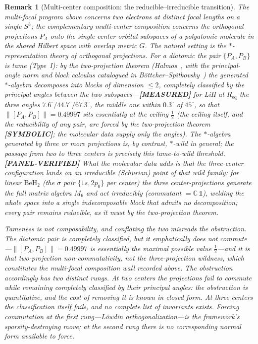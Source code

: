 \documentclass[11pt]{article}
\providecommand{\sthree}{S^3}
\newtheorem{remark}{Remark}
\begin{document}
\begin{remark}[Multi-center composition: the reducible--irreducible transition]
\label{rem:multicenter_composition}
The multi-focal program above concerns two electrons at distinct focal
lengths on a single $\sthree$; the complementary \emph{multi-center}
composition concerns the orthogonal projections $P_A$ onto the
single-center orbital subspaces of a polyatomic molecule in the shared
Hilbert space with overlap metric $G$.  The natural setting is the
\emph{$*$-representation} theory of orthogonal projections.  For a
\emph{diatomic} the pair $\{P_A, P_B\}$ is \emph{tame} (Type~I): by the
two-projection theorem (Halmos~\cite{halmos1969}, with the principal-angle
norm and block calculus catalogued in B\"ottcher--Spitkovsky~\cite{bottcher_spitkovsky2010})
the generated $*$-algebra decomposes
into blocks of dimension $\le 2$, completely classified by the principal
angles between the two subspaces---\textbf{[MEASURED]} for LiH at $R_{\mathrm{eq}}$ the three
angles $7.6^\circ / 44.7^\circ / 67.3^\circ$, the middle one within
$0.3^\circ$ of $45^\circ$, so that $\lVert [P_A, P_B] \rVert = 0.49997$
sits essentially at the ceiling $\tfrac12$ (the ceiling itself, and the
reducibility of any pair, are forced by the two-projection theorem
\textbf{[SYMBOLIC]}; the molecular data supply only the angles).  The
$*$-algebra generated by
\emph{three or more} projections is, by contrast, $*$-wild in general;
the passage from two to three centers is precisely this tame-to-wild
threshold.  \textbf{[PANEL-VERIFIED]} What the molecular data adds is that the three-center
configuration lands on an \emph{irreducible} (Schurian) point of that
wild family: for linear $\mathrm{BeH}_2$ (the $\sigma$ pair
$\{1s, 2p_0\}$ per center) the three center-projections generate the
\emph{full} matrix algebra $M_6$ and act irreducibly (commutant
$= \mathbb{C}\,\mathbb{1}$), welding the whole space into a single
indecomposable block that admits no decomposition; every pair remains
reducible, as it must by the two-projection theorem.

Tameness is not composability, and conflating the two misreads the
obstruction.  The diatomic pair is completely classified, but it
emphatically does not commute---$\lVert [P_A, P_B] \rVert = 0.49997$ is
essentially the maximal possible value $\tfrac12$---and it is that \emph{two}-projection
non-commutativity, not the three-projection wildness, which constitutes
the multi-focal composition wall recorded above.  The obstruction
accordingly has two distinct rungs.  At two centers the projections fail
to commute while remaining completely classified by their principal
angles: the obstruction is quantitative, and the cost of removing it is
known in closed form.  At three centers the classification itself fails,
and no complete list of invariants exists.  Forcing commutation at the
first rung---L\"owdin orthogonalization---is the framework's
sparsity-destroying move; at the second rung there is no corresponding
normal form available to force.


\end{remark}
\end{document}
